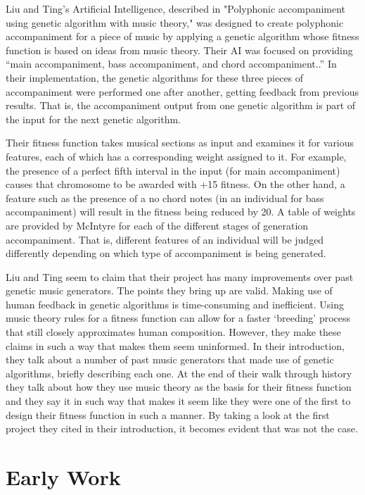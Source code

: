 \documentclass[conference]{IEEEtran}
\begin{document}
Liu and Ting's Artificial Intelligence, described in "Polyphonic accompaniment using genetic algorithm with music theory," was designed to create polyphonic accompaniment for a piece of music by applying a genetic algorithm whose fitness function is based on ideas from music theory\cite{b1}. Their AI was focused on providing “main accompaniment, bass accompaniment, and chord accompaniment.\cite{b1}.” In their implementation, the genetic algorithms for these three pieces of accompaniment were performed one after another, getting feedback from previous results. That is, the accompaniment output from one genetic algorithm is part of the input for the next genetic algorithm. 

Their fitness function takes musical sections as input and examines it for various features, each of which has a corresponding weight assigned to it. For example, the presence of a perfect fifth interval in the input (for main accompaniment) causes that chromosome to be awarded with +15 fitness. On the other hand, a feature such as the presence of a no chord notes (in an individual for bass accompaniment) will result in the fitness being reduced by 20. A table of weights are provided by McIntyre for each of the different stages of generation accompaniment. That is, different features of an individual will be judged differently depending on which type of accompaniment is being generated. 

Liu and Ting seem to claim that their project has many improvements over past genetic music generators\cite{b1}.  The points they bring up are valid.  Making use of human feedback in genetic algorithms is time-consuming and inefficient. Using music theory rules for a fitness function can allow for a faster ‘breeding’ process that still closely approximates human composition\cite{b1}.  However, they make these claims in such a way that makes them seem uninformed.  In their introduction, they talk about a number of past music generators that made use of genetic algorithms, briefly describing each one.  At the end of their walk through history they talk about how they use music theory as the basis for their fitness function and they say it in such way that makes it seem like they were one of the first to design their fitness function in such a manner\cite{b1}. By taking a look at the first project they cited in their introduction, it becomes evident that was not the case.



\section{Early Work}
\end{document}
